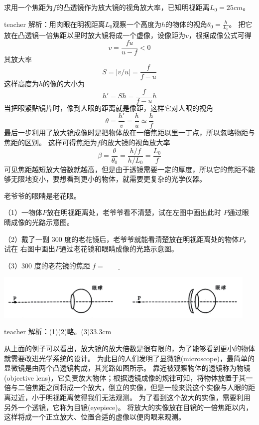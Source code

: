 \begin{example}
求用一个焦距为$f$的凸透镜作为放大镜的视角放大率，已知明视距离$L_0=25\unit{cm}$。
\begin{taggedblock}{teacher}
\newline
解析：用肉眼在明视距离$L_0$观察一个高度为$h$的物体的视角$\theta_0=\frac{h}{L_0}$。
把它放在凸透镜一倍焦距以里时放大镜将成一个虚像，设像距为$v$，根据成像公式可得
\[
v=\frac{fu}{u-f}<0
\]
其放大率
\[
S=|v/u|=\frac{f}{f-u}
\]
这样高度为$h$的像的大小为
\[
h' = Sh = \frac{f}{f-u}h
\]
当把眼紧贴镜片时，像到人眼的距离就是像距，这样它对人眼的视角
\[
\theta = \frac{h'}{v} = \frac{h}{u}\simeq\frac{h}{f}
\]
最后一步利用了放大镜成像时是把物体放在一倍焦距以里一丁点，所以忽略物距与焦距的区别。
这样可得焦距为$f$的放大镜的视角放大率
\[
\beta=\frac{\theta}{\theta_0}= \frac{h/f}{h/L_0} = \frac{L_0}{f}
\]
可见焦距越短放大倍数就越高，但是由于透镜需要一定的厚度，所以它的焦距不能够无限地变小，要想看到更小的物体，就需要更复杂的光学仪器。
\end{taggedblock}
\end{example}


\begin{example}
	老爷爷的眼睛是老花眼。
	
	（1）一物体$ P $放在明视距离处，老爷爷看不清楚，试在左图中画出此时 $P $通过眼	睛成像的光路示意图。
	
	（2）戴了一副 300 度的老花镜后，老爷爷就能看清楚放在明视距离处的物体$ P$，试在
	右图中画出$ P $通过老花镜和眼睛成像的光路示意图。
	
	（3）300 度的老花镜的焦距 $f=\underline{\qquad\qquad}$
	\begin{center}
		\includegraphics[width=0.95\textwidth]{images/opt-16.pdf}
	\end{center}
	\begin{taggedblock}{teacher}
		\noindent
		解析：(1)(2)略。(3)33.3cm
	\end{taggedblock}
\end{example}


从上面的例子可以看出，放大镜的放大倍数是很有限的，为了能够看到更小的物体就需要改进光学系统的设计。
为此目的人们发明了{\heiti 显微镜}(microscope)，最简单的显微镜是由两个凸透镜构成，其光路如图所示。
靠近被观察物体的透镜称为{\heiti 物镜}(objective lens)，它负责放大物体；根据透镜成像的规律可知，将物体放置于其一倍与二倍焦距之间将成一个放大，倒立的实像，但是一般来说这个实像与人眼的距离过近，小于明视距离使得我们无法观测。
为了看到这个放大的实像，需要利用另外一个透镜，它称为{\heiti 目镜}(eyepiece)。
将放大的实像放在目镜的一倍焦距以内，这样将成一个正立放大、位置合适的虚像以便肉眼来观测。

